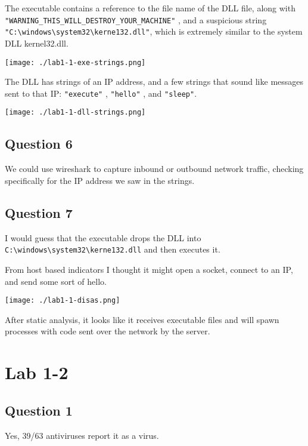 \documentclass[11pt]{article}
\begin{document}
The executable contains a reference to the file name of the DLL file,
along with \texttt{"WARNING\_THIS\_WILL\_DESTROY\_YOUR\_MACHINE"} , and a
suspicious string \texttt{"C:\textbackslash{}windows\textbackslash{}system32\textbackslash{}kerne132.dll"}, which is
extremely similar to the system DLL kernel32.dll.

\begin{center}
\texttt{[image: ./lab1-1-exe-strings.png]}
\end{center}

The DLL has strings of an IP address, and a few strings that sound
like messages sent to that IP: \texttt{"execute"} , \texttt{"hello"} , and \texttt{"sleep"}.

\begin{center}
\texttt{[image: ./lab1-1-dll-strings.png]}
\end{center}
\subsection{Question 6}
\label{sec:org447e55c}
We could use wireshark to capture inbound or outbound network traffic,
checking specifically for the IP address we saw in the strings.
\subsection{Question 7}
\label{sec:orga1c94de}
I would guess that the executable drops the DLL into
\texttt{C:\textbackslash{}windows\textbackslash{}system32\textbackslash{}kerne132.dll} and then executes it.

From host based indicators I thought it might open a socket, connect
to an IP, and send some sort of hello.

\begin{center}
\texttt{[image: ./lab1-1-disas.png]}
\end{center}

After static analysis, it looks like it receives executable files and
will spawn processes with code sent over the network by the server.
\section{Lab 1-2}
\label{sec:orgddc45df}
\subsection{Question 1}
\label{sec:org3cefb95}
Yes, 39/63 antiviruses report it as a virus.
\end{document}
